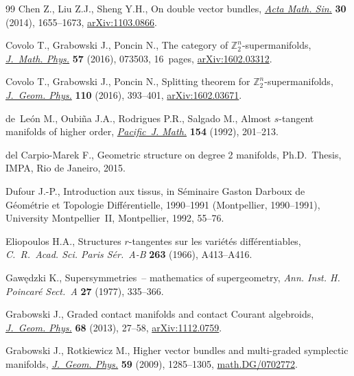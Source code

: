 \documentclass[pdftex]{sigma}
\numberwithin{equation}{section}
\begin{document}
\begin{thebibliography}{99}
Chen Z., Liu Z.J., Sheng Y.H., On double vector bundles, \href{http://dx.doi.org/10.1007/s10114-014-2412-4}{\textit{Acta Math.
  Sin.}} \textbf{30} (2014), 1655--1673, \href{http://arxiv.org/abs/1103.0866}{arXiv:1103.0866}.

Covolo T., Grabowski J., Poncin N., The category of {${\mathbb
  Z}_2^n$}-supermanifolds, \href{http://dx.doi.org/10.1063/1.4955416}{\textit{J.~Math. Phys.}} \textbf{57} (2016), 073503,
  16~pages, \href{http://arxiv.org/abs/1602.03312}{arXiv:1602.03312}.

Covolo T., Grabowski J., Poncin N., Splitting theorem for
  $\mathbb{Z}_{2}^{n}$-supermanifolds, \href{http://dx.doi.org/10.1016/j.geomphys.2016.09.006}{\textit{J.~Geom. Phys.}} \textbf{110}
  (2016), 393--401, \href{http://arxiv.org/abs/1602.03671}{arXiv:1602.03671}.

de~Le{\'o}n M., Oubi{\~n}a J.A., Rodrigues P.R., Salgado M., Almost
  {$s$}-tangent manifolds of higher order, \href{http://projecteuclid.org/euclid.pjm/1102635616}{\textit{Pacific~J. Math.}}
  \textbf{154} (1992), 201--213.

del Carpio-Marek F., Geometric structure on degree 2 manifolds, Ph.D.~Thesis,
  IMPA, Rio de Janeiro, 2015.

Dufour J.-P., Introduction aux tissus, in S\'eminaire {G}aston {D}arboux de
  {G}\'eom\'etrie et {T}opologie {D}if\/f\'erentielle, 1990--1991 ({M}ontpellier,
  1990--1991), University Montpellier~II, Montpellier, 1992, 55--76.

Eliopoulos H.A., Structures {$r$}-tangentes sur les vari\'et\'es
  dif\/f\'erentiables, \textit{C.~R.~Acad. Sci. Paris S\'er.~A-B} \textbf{263}
  (1966), A413--A416.

Gaw\k{e}dzki K., Supersymmetries~-- mathematics of supergeometry, \textit{Ann.
  Inst. H. Poincar\'e Sect.~A} \textbf{27} (1977), 335--366.

Grabowski J., Graded contact manifolds and contact {C}ourant algebroids,
  \href{http://dx.doi.org/10.1016/j.geomphys.2013.02.001}{\textit{J.~Geom. Phys.}} \textbf{68} (2013), 27--58, \href{http://arxiv.org/abs/1112.0759}{arXiv:1112.0759}.

Grabowski J., Rotkiewicz M., Higher vector bundles and multi-graded symplectic
  manifolds, \href{http://dx.doi.org/10.1016/j.geomphys.2009.06.009}{\textit{J.~Geom. Phys.}} \textbf{59} (2009), 1285--1305,
  \href{http://arxiv.org/abs/math.DG/0702772}{math.DG/0702772}.


\end{thebibliography}
\end{document}
